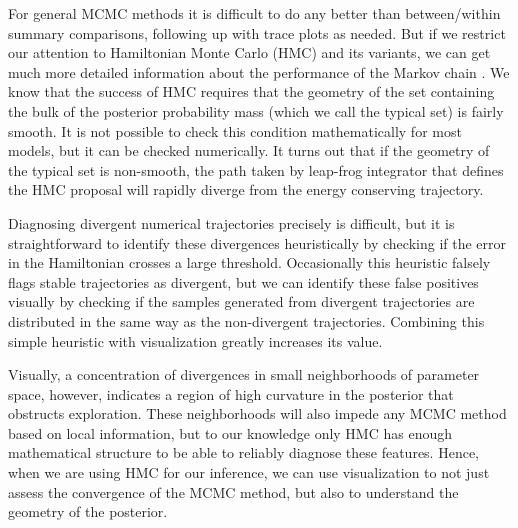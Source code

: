 \documentclass{statsoc}
\begin{document}
For general MCMC methods it is difficult to do any better than between/within
summary comparisons, following up with trace plots as needed.  But if we
restrict our attention to Hamiltonian Monte Carlo (HMC) and its variants, we can
get much more detailed information about the performance of the Markov chain
\citep{betancourt2017conceptual}. We know that the success of HMC requires that
the geometry of the set containing the bulk of the posterior probability mass
(which we call the typical set)  is fairly smooth. It is not possible to check
this condition mathematically for most models, but it can be checked
numerically. It turns out that if the geometry of the typical set is non-smooth,
the  path taken by leap-frog integrator that defines the HMC proposal will
rapidly diverge from the energy conserving trajectory.

Diagnosing divergent numerical trajectories precisely is difficult, but it is
straightforward to identify these divergences heuristically by checking if the
error in the Hamiltonian crosses a large threshold. Occasionally this heuristic
falsely flags stable trajectories as divergent, but we can identify these false
positives visually by checking if the samples generated from divergent
trajectories are distributed in the same way as the non-divergent trajectories.
Combining this simple heuristic with visualization greatly increases its value.

 Visually, a concentration of divergences in small neighborhoods of parameter
 space, however, indicates a region of high curvature in the posterior that
 obstructs exploration.  These neighborhoods will also impede any  MCMC method
 based on local information, but to our knowledge only HMC has enough
 mathematical structure to be able to reliably diagnose these features. Hence,
 when we are using HMC for our inference, we can use visualization to not just
 assess the convergence of the MCMC method, but also to understand the geometry
 of the posterior.
\end{document}
